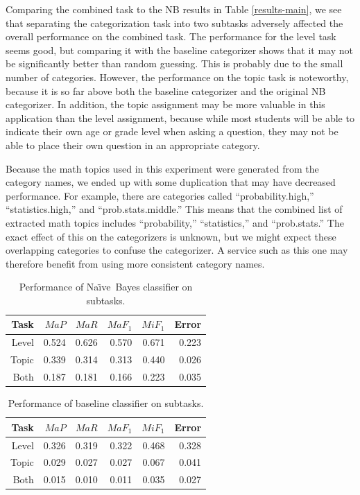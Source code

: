 \documentclass{article}
\newcommand{\naive}{Na\"\i ve}
\begin{document}
Comparing the combined task to the NB results in Table
\ref{results-main}, we see that separating the categorization task
into two subtasks adversely affected the overall performance on the combined task.
The performance for the level task seems good, but comparing it with the baseline
categorizer shows that it may not be significantly better than random
guessing.  This is probably due to the small number of categories.
However, the performance on the topic task is noteworthy,
because it is so far above both the baseline categorizer and the
original NB categorizer.  In addition, the topic assignment may be
more valuable in this application than the level assignment, because while most students
will be able to indicate their own age or grade level when asking a
question, they may not be able to place their own question in an
appropriate category.

Because the math topics used in this experiment were generated from
the category names, we ended up with some duplication that may have
decreased performance.  For example, there are categories called
``probability.high,'' ``statistics.high,'' and ``prob.stats.middle.''
This means that the combined list of extracted math topics includes
``probability,'' ``statistics,'' and ``prob.stats.''  The exact effect
of this on the categorizers is unknown, but we might expect these
overlapping categories to confuse the categorizer.  A service such as
this one may therefore benefit from using more consistent category
names.


\begin{table}
\begin{tabular}{|r|r|r|r|r|r|}
\hline
Task     & $MaP$   & $MaR$   & $MaF_1$ & $MiF_1$ & Error \\ \hline
Level    & 0.524   & 0.626   & 0.570   & 0.671   & 0.223 \\ \hline
Topic    & 0.339   & 0.314   & 0.313   & 0.440   & 0.026 \\ \hline
Both     & 0.187   & 0.181   & 0.166   & 0.223   & 0.035 \\ \hline
\end{tabular}
\caption{Performance of \naive\ Bayes classifier on subtasks.}
\label{results-NB}
\end{table}

\begin{table}
\begin{tabular}{|r|r|r|r|r|r|}
\hline
Task     & $MaP$   & $MaR$   & $MaF_1$ & $MiF_1$ & Error \\ \hline
Level    & 0.326   & 0.319   & 0.322   & 0.468   & 0.328 \\ \hline
Topic    & 0.029   & 0.027   & 0.027   & 0.067   & 0.041 \\ \hline
Both     & 0.015   & 0.010   & 0.011   & 0.035   & 0.027 \\ \hline
\end{tabular}
\caption{Performance of baseline classifier on subtasks.}
\label{results-baseline}
\end{table}
\end{document}

